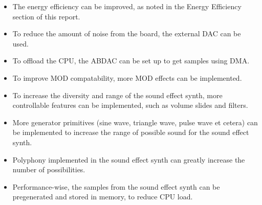 \begin{itemize}
\item{The energy efficiency can be improved, as noted in the Energy Efficiency section of this report.}

\item{To reduce the amount of noise from the board, the external DAC can be used.}

\item{To offload the CPU, the ABDAC can be set up to get samples using DMA.}

\item{To improve MOD compatability, more MOD effects can be implemented.}

\item{To increase the diversity and range of the sound effect synth, more controllable features can be implemented, such as volume slides and filters.}

\item{More generator primitives (sine wave, triangle wave, pulse wave et cetera) can be implemented to increase the range of possible sound for the sound effect synth.}

\item{Polyphony implemented in the sound effect synth can greatly increase the number of possibilities.}

\item{Performance-wise, the samples from the sound effect synth can be pregenerated and stored in memory, to reduce CPU load.}
\end{itemize}
